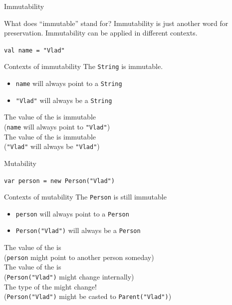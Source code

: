 \begin{frame}[fragile]{Immutability}
\begin{block}{What does ``immutable'' stand for?}
Immutability is just another word for preservation. Immutability can be applied
in different contexts.
\end{block}
\pause
\begin{center}
\lstinline!val name = "Vlad"!
\end{center}
\pause
\begin{block}{Contexts of immutability}
The  \lstinline!String! is immutable.\\
\begin{itemize}
\item \lstinline!name! will always point to a \lstinline!String!
\item \lstinline!"Vlad"! will always be a \lstinline!String!
\end{itemize}
\pause
The value of the  is immutable\\
(\lstinline!name! will always point to \lstinline!"Vlad"!)\\
\pause
The value of the  is immutable\\
(\lstinline!"Vlad"! will always be \lstinline!"Vlad"!)
\end{block}
\end{frame}

\begin{frame}[fragile]{Mutability}
\begin{center}
\lstinline!var person = new Person("Vlad")!
\end{center}
\pause
\begin{block}{Contexts of mutability}
The  \lstinline!Person! is still \alert{im}mutable\\
\begin{itemize}
\item \lstinline!person! will always point to a \lstinline!Person!
\item \lstinline!Person("Vlad")! will always be a \lstinline!Person!
\end{itemize}
\pause
The value of the  is \\
(\lstinline!person! might point to \alert{another} person someday)\\
\pause
The value of the  is \\
(\lstinline!Person("Vlad")! might \alert{change internally})\\
\pause
The \alert{type} of the  might \alert{change}!\\
(\lstinline!Person("Vlad")! might be casted to \lstinline!Parent("Vlad")!)
\end{block}
\end{frame}

